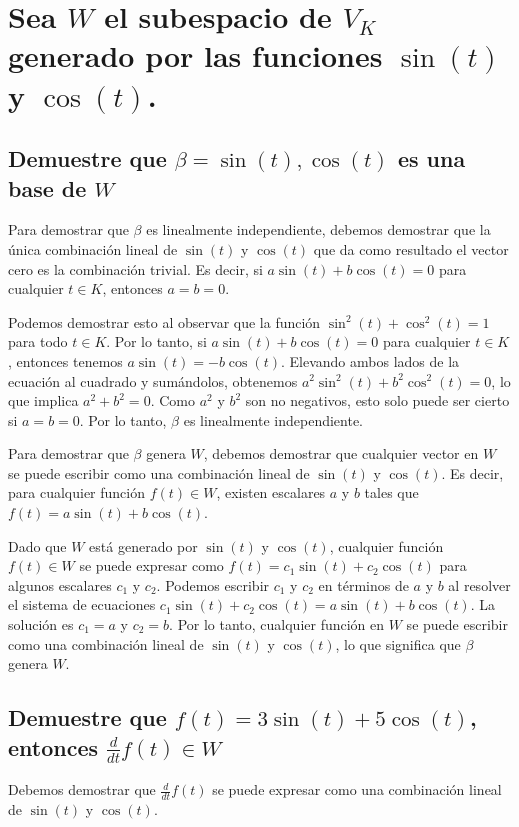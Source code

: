 \section{Sea $W$ el subespacio de $V_K$ generado por las funciones $\sin(t)$ y $\cos(t)$.}

\subsection{Demuestre que $\beta={\sin(t), \cos(t)}$ es una base de $W$}
Para demostrar que $\beta$ es linealmente independiente, debemos demostrar que la única combinación lineal de $\sin(t)$ y $\cos(t)$ 
que da como resultado el vector cero es la combinación trivial. Es decir, si $a\sin(t) + b\cos(t) = 0$ para cualquier $t\in K$, entonces $a=b=0$.

Podemos demostrar esto al observar que la función $\sin^2(t) + \cos^2(t) = 1$ para todo $t\in K$. Por lo tanto, si $a\sin(t) + b\cos(t) = 0$ 
para cualquier $t\in K$, entonces tenemos $a\sin(t) = -b\cos(t)$. Elevando ambos lados de la ecuación al cuadrado y sumándolos, obtenemos 
$a^2\sin^2(t) + b^2\cos^2(t) = 0$, lo que implica $a^2+b^2=0$. Como $a^2$ y $b^2$ son no negativos, esto solo puede ser cierto si $a=b=0$. 
Por lo tanto, $\beta$ es linealmente independiente.

Para demostrar que $\beta$ genera $W$, debemos demostrar que cualquier vector en $W$ se puede escribir como una combinación lineal de $\sin(t)$ y $\cos(t)$. 
Es decir, para cualquier función $f(t)\in W$, existen escalares $a$ y $b$ tales que $f(t) = a\sin(t) + b\cos(t)$.

Dado que $W$ está generado por $\sin(t)$ y $\cos(t)$, cualquier función $f(t)\in W$ se puede expresar como $f(t) = c_1\sin(t) + c_2\cos(t)$ para 
algunos escalares $c_1$ y $c_2$. Podemos escribir $c_1$ y $c_2$ en términos de $a$ y $b$ al resolver el sistema de ecuaciones 
$c_1\sin(t) + c_2\cos(t) = a\sin(t) + b\cos(t)$. La solución es $c_1 = a$ y $c_2 = b$. Por lo tanto, cualquier función en $W$ se puede 
escribir como una combinación lineal de $\sin(t)$ y $\cos(t)$, lo que significa que $\beta$ genera $W$.

\subsection{Demuestre que $f(t) = 3\sin(t) + 5\cos(t)$, entonces $\frac{d}{dt}f(t) \in W$}

Debemos demostrar que $\frac{d}{dt}f(t)$ se puede expresar como una combinación lineal de $\sin(t)$ y $\cos(t)$.

